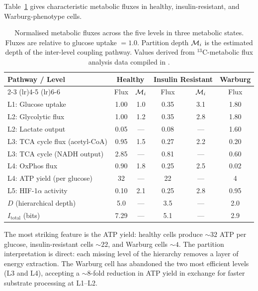 Table~\ref{tab:metabolic_flux} gives characteristic metabolic fluxes in
healthy, insulin-resistant, and Warburg-phenotype cells.

\begin{table}[htbp]
\centering
\caption{Normalised metabolic fluxes across the five levels in three
  metabolic states. Fluxes are relative to glucose uptake $= 1.0$.
  Partition depth $\mathcal{M}_i$ is the estimated depth of the inter-level
  coupling pathway. Values derived from $^{13}$C-metabolic flux analysis
  data compiled in \citet{TeSlaa2016}.}
\label{tab:metabolic_flux}
\small
\begin{tabular}{lccccc}
\toprule
Pathway / Level & \multicolumn{2}{c}{Healthy} & \multicolumn{2}{c}{Insulin Resistant} & Warburg \\
\cmidrule(lr){2-3} \cmidrule(lr){4-5} \cmidrule(lr){6-6}
 & Flux & $\mathcal{M}_i$ & Flux & $\mathcal{M}_i$ & Flux \\
\midrule
L1: Glucose uptake          & 1.00 & 1.0 & 0.35 & 3.1 & 1.80 \\
L2: Glycolytic flux          & 1.00 & 1.2 & 0.35 & 2.8 & 1.80 \\
L2: Lactate output           & 0.05 & --- & 0.08 & --- & 1.60 \\
L3: TCA cycle flux (acetyl-CoA) & 0.95 & 1.5 & 0.27 & 2.2 & 0.20 \\
L3: TCA cycle (NADH output)  & 2.85 & --- & 0.81 & --- & 0.60 \\
L4: OxPhos flux              & 0.90 & 1.8 & 0.25 & 2.5 & 0.02 \\
L4: ATP yield (per glucose)  & 32   & --- & 22   & --- & 4    \\
L5: HIF-1$\alpha$ activity   & 0.10 & 2.1 & 0.25 & 2.8 & 0.95 \\
$D$ (hierarchical depth)     & 5.0  & --- & 3.5  & --- & 2.0  \\
$I_{\mathrm{total}}$ (bits)  & 7.29 & --- & 5.1  & --- & 2.9  \\
\bottomrule
\end{tabular}
\end{table}

The most striking feature is the ATP yield: healthy cells produce $\sim 32$
ATP per glucose, insulin-resistant cells $\sim 22$, and Warburg cells $\sim 4$.
The partition interpretation is direct: each missing level of the hierarchy
removes a layer of energy extraction. The Warburg cell has abandoned the
two most efficient levels (L3 and L4), accepting a $\sim 8$-fold reduction
in ATP yield in exchange for faster substrate processing at L1--L2.

